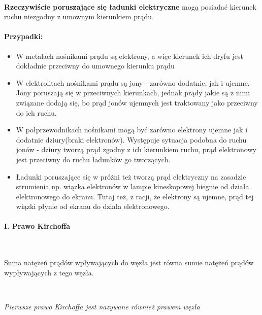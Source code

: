 \documentclass{article}
\begin{document}
            \
            
            \textbf{Rzeczywiście poruszające się ładunki elektryczne}
            mogą posiadać kierunek ruchu niezgodny z umownym kierunkiem
            prądu.

            \paragraph{Przypadki: }
            \begin{itemize}
                \item W metalach nośnikami prądu są elektrony, a więc
                kierunek ich dryfu jest dokładnie przeciwny do umownego
                kierunku prądu
                \item W elektrolitach nośnikami prądu są jony -
                zarówno dodatnie, jak i ujemne. Jony poruszają się w
                przeciwnych kierunkach, jednak prądy jakie są z nimi
                związane dodają się, bo prąd jonów ujemnych jest
                traktowany jako przeciwny do ich ruchu.
                \item W połprzewodnikach nośnikami mogą być zarówno
                elektrony ujemne jak i dodatnie dziury(braki elektronów).
                Występuje sytuacja podobna do ruchu jonów - dziury tworzą
                prąd zgodny z ich kierunkiem ruchu, prąd elektronowy jest
                przeciwny do ruchu ładunków go tworzących.
                \item Ładunki poruszające się w próżni też tworzą prąd elektryczny
                na zasadzie strumienia np. wiązka elektronów w lampie kineskopowej
                biegnie od działa elektronowego do ekranu. Tutaj też, z racji,
                że elektrony są ujemne, prąd tej wiązki płynie od ekranu do
                działa elektronowego.
            \end{itemize}

            \paragraph{I. Prawo Kirchoffa}
            
            \
            
            Suma natężeń prądów wpływających do węzła jest równa sumie
            natężeń prądów wypływających z tego węzła.
            
            \
            
            \textit{Pierwsze prawo Kirchoffa jest nazywane również prawem węzła}
\end{document}
